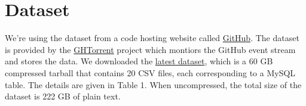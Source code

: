 \newpage
\section{Dataset}

We're using the dataset from a code hosting website called \href{http://github.com/}{GitHub}.
The dataset is provided by the \href{http://ghtorrent.org/}{GHTorrent} project which montiors the GitHub event stream and stores the data.
We downloaded the \href{http://ghtorrent-downloads.ewi.tudelft.nl/mysql/mysql-2017-09-01.tar.gz}{latest dataset}, which is a 60 GB compressed tarball that contains 20 CSV files, each corresponding to a MySQL table. The details are given in Table 1. When uncompressed, the total size of the dataset is 222 GB of plain text.

\par

